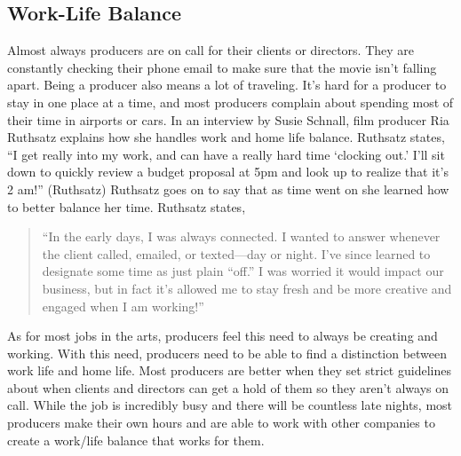 \begin{multicols}{2}
\section{Work-Life Balance}
	Almost always producers are on call for their clients or directors. They are constantly checking their phone email to make sure that the movie isn’t falling apart. Being a producer also means a lot of traveling. It’s hard for a producer to stay in one place at a time, and most producers complain about spending most of their time in airports or cars. In an interview by Susie Schnall, film producer Ria Ruthsatz explains how she handles work and home life balance. Ruthsatz states, “I get really into my work, and can have a really hard time ‘clocking out.’ I’ll sit down to quickly review a budget proposal at 5pm and look up to realize that it’s 2 am!” (Ruthsatz) Ruthsatz goes on to say that as time went on she learned how to better balance her time. Ruthsatz states, 
	
	\begin{quote}
		“In the early days, I was always connected. I wanted to answer whenever the client called, emailed, or texted—day or night. I’ve since learned to designate some time as just plain “off.” I was worried it would impact our business, but in fact it’s allowed me to stay fresh and be more creative and engaged when I am working!” 
	\end{quote}
	
	As for most jobs in the arts, producers feel this need to always be creating and working. With this need, producers need to be able to find a distinction between work life and home life. Most producers are better when they set strict guidelines about when clients and directors can get a hold of them so they aren’t always on call. While the job is incredibly busy and there will be countless late nights, most producers make their own hours and are able to work with other companies to create a work/life balance that works for them.
\end{multicols}